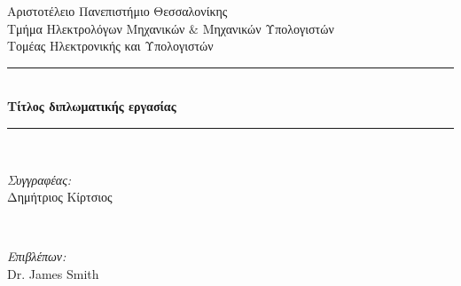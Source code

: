 \begin{titlepage}
    
    \newcommand{\HRule}{\rule{\linewidth}{0.5mm}} %
    
    \center %
     
    
    {\LARGE Αριστοτέλειο Πανεπιστήμιο Θεσσαλονίκης}\\[1.5cm] %
    {\Large Τμήμα Ηλεκτρολόγων Μηχανικών $\&$ Μηχανικών Υπολογιστών}\\[0.5cm] %
    {\large Τομέας Ηλεκτρονικής και Υπολογιστών}\\[0.5cm] %
    
    
    \HRule \\[0.4cm]
    { \huge \bfseries Τίτλος διπλωματικής εργασίας}\\[0.4cm] %
    \HRule \\[1.5cm]
     
    
    \begin{minipage}{0.4\textwidth}
    \begin{flushleft} \large
    \emph{Συγγραφέας:}\\
    Δημήτριος {Κίρτσιος} %
    \end{flushleft}
    \end{minipage}
    ~
    \begin{minipage}{0.4\textwidth}
    \begin{flushright} \large
    \emph{Επιβλέπων:} \\
    Dr. James {Smith} %
    \end{flushright}
    \end{minipage}\\[2cm]
    

\end{titlepage}
